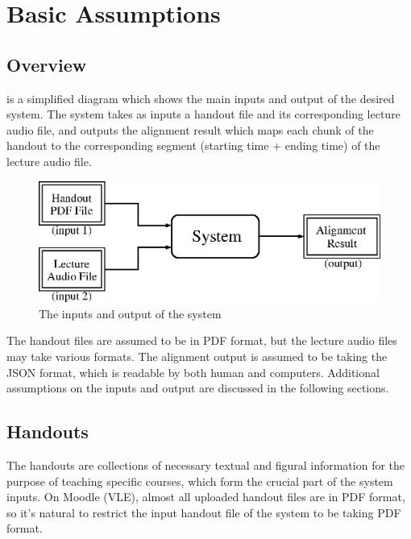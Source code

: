 
\chapter{Basic Assumptions}

\ifpdf
    \graphicspath{{Chapter2/Figs/Raster/}{Chapter2/Figs/PDF/}{Chapter2/Figs/}}
\else
    \graphicspath{{Chapter2/Figs/Vector/}{Chapter2/Figs/}}
\fi


\section{Overview}

 is a simplified diagram which shows the main inputs and output of the desired system. The system takes as inputs a handout file and its corresponding lecture audio file, and outputs the alignment result which maps each chunk of the handout to the corresponding segment (starting time + ending time) of the lecture audio file.

\begin{figure}[!hb]
  \centering
  \includegraphics[width=.75\textwidth]{sys-diagram.eps}
  \caption{The inputs and output of the system}
  \label{fig:sys-diagram-basic}
\end{figure}

The handout files are assumed to be in PDF format, but the lecture audio files may take various formats. The alignment output is assumed to be taking the JSON format, which is readable by both human and computers. Additional assumptions on the inputs and output are discussed in the following sections.


\section{Handouts}

The handouts are collections of necessary textual and figural information for the purpose of teaching specific courses, which form the crucial part of the system inputs. On Moodle (VLE), almost all uploaded handout files are in PDF format, so it's natural to restrict the input handout file of the system to be taking PDF format.

